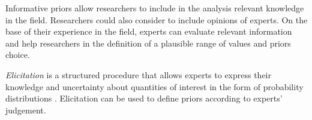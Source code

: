 \documentclass[graybox]{svmult}
\begin{document}
Informative priors allow researchers to include in the analysis relevant knowledge in the field. Researchers could also consider to include opinions of experts. On the base of their experience in the field, experts can evaluate relevant information and help researchers in the definition of a plausible range of values and priors choice.

\emph{Elicitation} is a structured procedure that allows experts to express their knowledge and uncertainty about quantities of interest in the form of probability distributions \cite{ohaganExpertKnowledgeElicitation2019,ohaganUncertainJudgementsEliciting2006}. Elicitation can be used to define priors according to  experts' judgement.


\end{document}
